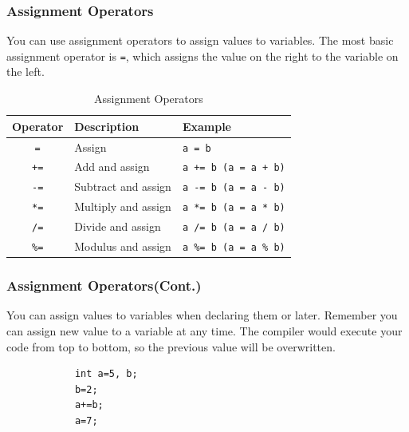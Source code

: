 \documentclass[xcolor=dvipsnames]{beamer}
\begin{document}
    \begin{frame}
        \frametitle{Assignment Operators}
        You can use assignment operators to assign values to variables. The most basic assignment operator is \texttt{=}, which assigns the value on the right to the variable on the left.\\
        \begin{table}[h]
        \centering
        \caption{Assignment Operators}
        \begin{tabular}{cll}
        \toprule
        \textbf{Operator} & \textbf{Description} & \textbf{Example} \\
         \midrule
              \texttt{=}   & Assign & \texttt{a = b} \\
                \texttt{+=}  & Add and assign & \texttt{a += b (a = a + b)} \\
                \texttt{-=}  & Subtract and assign & \texttt{a -= b (a = a - b)} \\
                \texttt{*=}  & Multiply and assign & \texttt{a *= b (a = a * b)} \\
                \texttt{/=}  & Divide and assign & \texttt{a /= b (a = a / b)} \\
                \texttt{\%=}  & Modulus and assign & \texttt{a \%= b (a = a \% b)} \\
        \bottomrule
        \end{tabular}
        \end{table}
    \end{frame}
    \begin{frame}[fragile]
        \frametitle{Assignment Operators(Cont.)}
        You can assign values to variables when declaring them or later. Remember you can assign new value to a variable at any time. The compiler would execute your code from top to bottom, so the previous value will be overwritten.
        \begin{verbatim}
            int a=5, b;
            b=2;
            a+=b;
            a=7;
        \end{verbatim}
    \end{frame}
\end{document}
